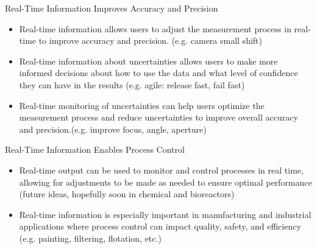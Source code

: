 \begin{frame}[label=why-7]{Real-Time Information Improves Accuracy and Precision}

\begin{itemize}
\item Real-time information allows users to adjust the measurement process in real-time to improve accuracy and precision. (e.g. camera small shift)
\item Real-time information about uncertainties allows users to make more informed decisions about how to use the data and what level of confidence they can have in the results (e.g. agile: release fast, fail fast) 
\item Real-time monitoring of uncertainties can help users optimize the measurement process and reduce uncertainties to improve overall accuracy and precision.(e.g. improve focus, angle, aperture)
\end{itemize}
\end{frame}


\begin{frame}[label=why-9]{Real-Time Information Enables Process Control}

\begin{itemize}
\item Real-time output can be used to monitor and control processes in real time, allowing for adjustments to be made as needed to ensure optimal performance (future ideas, hopefully soon in chemical and bioreactors)
\item Real-time information is especially important in manufacturing and industrial applications where process control can impact quality, safety, and efficiency (e.g. painting, filtering, flotation, etc.)
\end{itemize}
\end{frame}

